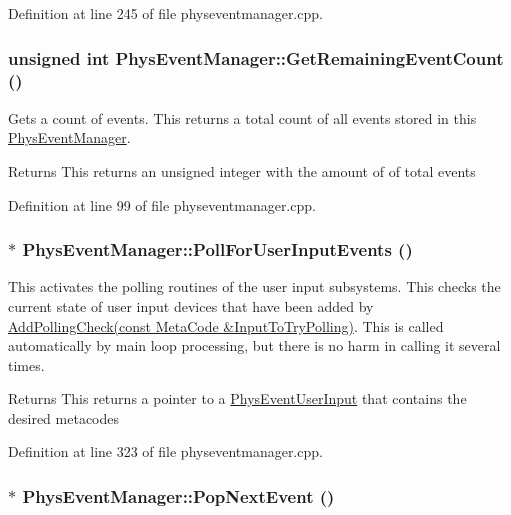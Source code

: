 Definition at line 245 of file physeventmanager.cpp.\hypertarget{classPhysEventManager_ab14d238e7abe9919be8e2d9eef388b64}{
\subsubsection[{GetRemainingEventCount}]{\setlength{\rightskip}{0pt plus 5cm}unsigned int PhysEventManager::GetRemainingEventCount ()}}
\label{d5/dd7/classPhysEventManager_ab14d238e7abe9919be8e2d9eef388b64}


Gets a count of events. This returns a total count of all events stored in this \hyperlink{classPhysEventManager}{PhysEventManager}. \begin{DoxyReturn}{Returns}
This returns an unsigned integer with the amount of of total events 
\end{DoxyReturn}


Definition at line 99 of file physeventmanager.cpp.\hypertarget{classPhysEventManager_ac66ebe495e2a77d06803291711528db2}{
\subsubsection[{PollForUserInputEvents}]{ $\ast$ PhysEventManager::PollForUserInputEvents ()}}
\label{d5/dd7/classPhysEventManager_ac66ebe495e2a77d06803291711528db2}


This activates the polling routines of the user input subsystems. This checks the current state of user input devices that have been added by \hyperlink{classPhysEventManager_a1e99385441c5377a741561db581ef3ae}{AddPollingCheck(const MetaCode \&InputToTryPolling)}. This is called automatically by main loop processing, but there is no harm in calling it several times. \begin{DoxyReturn}{Returns}
This returns a pointer to a \hyperlink{classPhysEventUserInput}{PhysEventUserInput} that contains the desired metacodes 
\end{DoxyReturn}


Definition at line 323 of file physeventmanager.cpp.\hypertarget{classPhysEventManager_a3122b32172326ac32cfecc828b820977}{
\subsubsection[{PopNextEvent}]{ $\ast$ PhysEventManager::PopNextEvent ()}}
\label{d5/dd7/classPhysEventManager_a3122b32172326ac32cfecc828b820977}


